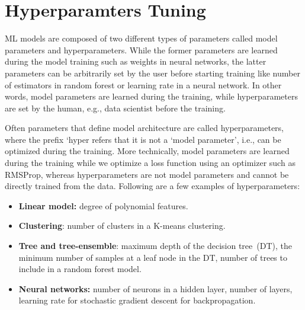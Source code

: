 \section{Hyperparamters Tuning}
ML models are composed of two different types of parameters called model parameters and hyperparameters. While the former parameters are learned during the model training such as weights in neural networks, the latter parameters can be arbitrarily set by the user before starting training like number of estimators in random forest or learning rate in a neural network. In other words, model parameters are learned during the training, while hyperparameters are set by the human, e.g., data scientist before the training.

\hspace*{3.5mm} Often parameters that define model architecture are called hyperparameters, where the prefix `hyper refers that it is not a `model parameter', i.e., can be optimized during the training. More technically, model parameters are learned during the training while we optimize a loss function using an optimizer such as RMSProp, whereas hyperparameters are not model parameters and cannot be directly trained from the data. Following are a few examples of hyperparameters: 

\vspace{-1mm}
\begin{itemize}[noitemsep]
    \item \textbf{Linear model:} degree of polynomial features.
    \item \textbf{Clustering}: number of clusters in a K-means clustering.
    \item \textbf{Tree and tree-ensemble}: maximum depth of the decision tree~(DT), the minimum number of samples at a leaf node in the DT, number of trees to include in a random forest model. 
    \item \textbf{Neural networks:} number of neurons in a hidden layer, number of layers, learning rate for stochastic gradient descent for backpropagation. 
\end{itemize} 
\vspace{-2mm}

